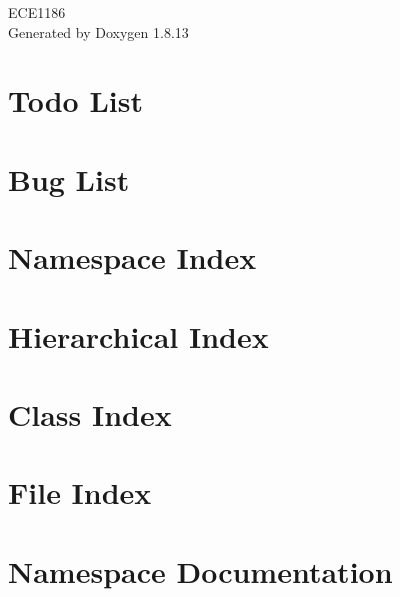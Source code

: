 \documentclass[twoside]{book}
\newcommand{\+}{\discretionary{\mbox{\scriptsize$\hookleftarrow$}}{}{}}
\newcommand{\clearemptydoublepage}{%
  \newpage{\pagestyle{empty}\cleardoublepage}%
}
\begin{document}
\hypersetup{pageanchor=false,
             bookmarksnumbered=true,
             pdfencoding=unicode
            }
\begin{titlepage}
\vspace*{7cm}
\begin{center}%
{\Large E\+C\+E1186 }\\
\vspace*{1cm}
{\large Generated by Doxygen 1.8.13}\\
\end{center}
\end{titlepage}
\clearemptydoublepage
{}
\tableofcontents
\clearemptydoublepage
{}
\hypersetup{pageanchor=true}

\chapter{Todo List}
\label{todo}

\chapter{Bug List}
\label{bug}

\chapter{Namespace Index}

\chapter{Hierarchical Index}

\chapter{Class Index}

\chapter{File Index}

\chapter{Namespace Documentation}






\end{document}
